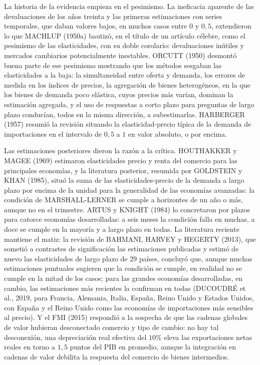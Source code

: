 \documentclass[10pt,a4paper]{article}
\begin{document}
La historia de la evidencia empieza en el pesimismo. La ineficacia aparente de las devaluaciones de los años treinta y las primeras estimaciones con series temporales, que daban valores bajos, en muchos casos entre $0$ y $0{,}5$, extendieron lo que MACHLUP (1950a) bautizó, en el título de un artículo célebre, como el pesimismo de las elasticidades, con su doble corolario: devaluaciones inútiles y mercados cambiarios potencialmente inestables. ORCUTT (1950) desmontó buena parte de ese pesimismo mostrando que los métodos sesgaban las elasticidades a la baja: la simultaneidad entre oferta y demanda, los errores de medida en los índices de precios, la agregación de bienes heterogéneos, en la que los bienes de demanda poco elástica, cuyos precios más varían, dominan la estimación agregada, y el uso de respuestas a corto plazo para preguntas de largo plazo conducían, todos en la misma dirección, a subestimarlas. HARBERGER (1957) resumió la revisión situando la elasticidad-precio típica de la demanda de importaciones en el intervalo de $0{,}5$ a $1$ en valor absoluto, o por encima.

Las estimaciones posteriores dieron la razón a la crítica. HOUTHAKKER y MAGEE (1969) estimaron elasticidades precio y renta del comercio para las principales economías, y la literatura posterior, resumida por GOLDSTEIN y KHAN (1985), situó la suma de las elasticidades-precio de la demanda a largo plazo por encima de la unidad para la generalidad de las economías avanzadas: la condición de MARSHALL-LERNER se cumple a horizontes de un año o más, aunque no en el trimestre. ARTUS y KNIGHT (1984) lo concretaron por plazos para catorce economías desarrolladas: a seis meses la condición falla en muchas, a doce se cumple en la mayoría y a largo plazo en todas. La literatura reciente mantiene el matiz: la revisión de BAHMANI, HARVEY y HEGERTY (2013), que sometió a contrastes de significación las estimaciones publicadas y estimó de nuevo las elasticidades de largo plazo de $29$ países, concluyó que, aunque muchas estimaciones puntuales sugieren que la condición se cumple, en realidad no se cumple en la mitad de los casos; para las grandes economías desarrolladas, en cambio, las estimaciones más recientes la confirman en todas (DUCOUDRÉ et al., 2019, para Francia, Alemania, Italia, España, Reino Unido y Estados Unidos, con España y el Reino Unido como las economías de importaciones más sensibles al precio). Y el FMI (2015) respondió a la sospecha de que las cadenas globales de valor hubieran desconectado comercio y tipo de cambio: no hay tal desconexión, una depreciación real efectiva del $10\%$ eleva las exportaciones netas reales en torno a $1{,}5$ puntos del PIB en promedio, aunque la integración en cadenas de valor debilita la respuesta del comercio de bienes intermedios.
\end{document}
